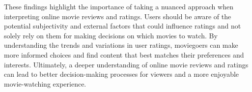 \documentclass[
]{article}
\begin{document}
These findings highlight the importance of taking a nuanced approach
when interpreting online movie reviews and ratings. Users should be
aware of the potential subjectivity and external factors that could
influence ratings and not solely rely on them for making decisions on
which movies to watch. By understanding the trends and variations in
user ratings, moviegoers can make more informed choices and find content
that best matches their preferences and interests. Ultimately, a deeper
understanding of online movie reviews and ratings can lead to better
decision-making processes for viewers and a more enjoyable
movie-watching experience.
\end{document}
